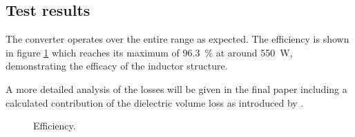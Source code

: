 \documentclass{IPEC2026}
\begin{document}
\subsection{Test results}
The converter operates over the entire range as expected. The efficiency is shown in figure \ref{fig:Efficiency} which reaches its maximum of \qty{96.3}{\percent} at around \qty{550}{\W}, demonstrating the efficacy of the inductor structure.

A more detailed analysis of the losses will be given in the final paper including a calculated contribution of the dielectric volume loss as introduced by \cite{baumannInvestigationCorelossMechanisms2022}. 

\begin{figure}
  \centering
  
  \caption{Efficiency.}
  \label{fig:Efficiency}
\end{figure}



\end{document}
